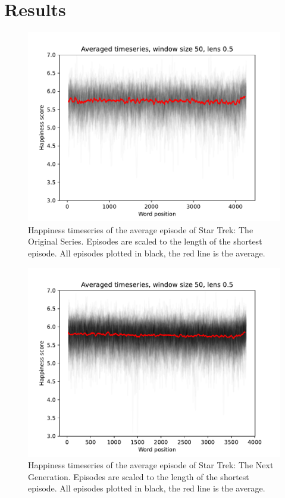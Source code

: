 \section{Results}
\label{sec:papertag.results}


\begin{figure}
    \centering
    \includegraphics[width=\columnwidth]{figures/localized/average_episode_tos.pdf}
    \caption{Happiness timeseries of the average episode of Star Trek: The Original Series. Episodes are scaled to the length of the shortest episode. All episodes plotted in black, the red line is the average.}
    \label{fig:average_episode_tos}
\end{figure}

\begin{figure}
    \centering
    \includegraphics[width=\columnwidth]{figures/localized/average_episode_tng.pdf}
    \caption{Happiness timeseries of the average episode of Star Trek: The Next Generation. Episodes are scaled to the length of the shortest episode. All episodes plotted in black, the red line is the average.}
    \label{fig:average_episode_tng}
\end{figure}

